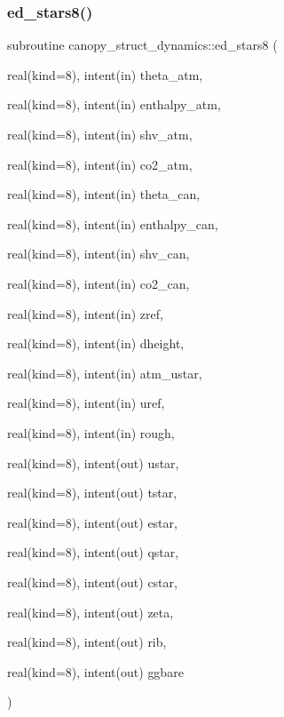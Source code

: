 \subsubsection{\texorpdfstring{ed\+\_\+stars8()}{ed\_stars8()}}
{\footnotesize\ttfamily subroutine canopy\+\_\+struct\+\_\+dynamics\+::ed\+\_\+stars8 (\begin{DoxyParamCaption}\item[{real(kind=8), intent(in)}]{theta\+\_\+atm,  }\item[{real(kind=8), intent(in)}]{enthalpy\+\_\+atm,  }\item[{real(kind=8), intent(in)}]{shv\+\_\+atm,  }\item[{real(kind=8), intent(in)}]{co2\+\_\+atm,  }\item[{real(kind=8), intent(in)}]{theta\+\_\+can,  }\item[{real(kind=8), intent(in)}]{enthalpy\+\_\+can,  }\item[{real(kind=8), intent(in)}]{shv\+\_\+can,  }\item[{real(kind=8), intent(in)}]{co2\+\_\+can,  }\item[{real(kind=8), intent(in)}]{zref,  }\item[{real(kind=8), intent(in)}]{dheight,  }\item[{real(kind=8), intent(in)}]{atm\+\_\+ustar,  }\item[{real(kind=8), intent(in)}]{uref,  }\item[{real(kind=8), intent(in)}]{rough,  }\item[{real(kind=8), intent(out)}]{ustar,  }\item[{real(kind=8), intent(out)}]{tstar,  }\item[{real(kind=8), intent(out)}]{estar,  }\item[{real(kind=8), intent(out)}]{qstar,  }\item[{real(kind=8), intent(out)}]{cstar,  }\item[{real(kind=8), intent(out)}]{zeta,  }\item[{real(kind=8), intent(out)}]{rib,  }\item[{real(kind=8), intent(out)}]{ggbare }\end{DoxyParamCaption})}

